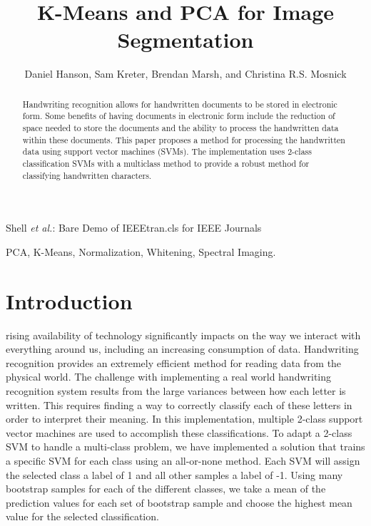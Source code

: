 \documentclass[journal]{IEEEtran}
\begin{document}
\title{K-Means and PCA for Image\\ Segmentation}


\author{Daniel Hanson, Sam Kreter, Brendan Marsh, and Christina R.S. Mosnick}

{Shell \MakeLowercase{\textit{et al.}}: Bare Demo of IEEEtran.cls for IEEE Journals}

\maketitle

\begin{abstract}
Handwriting recognition allows for handwritten documents to be stored in electronic form. Some benefits of having documents in electronic form include the reduction of space needed to store the documents and the ability to process the handwritten data within these documents. This paper proposes a method for processing the handwritten data using support vector machines (SVMs). The implementation uses 2-class classification SVMs with a multiclass method to provide a robust method for classifying handwritten characters.
\end{abstract}

\begin{IEEEkeywords}
    PCA, K-Means, Normalization, Whitening, Spectral Imaging.
\end{IEEEkeywords}

\IEEEpeerreviewmaketitle

\section{Introduction}

 rising availability of technology significantly impacts on the way we interact with everything around us, including an increasing consumption of data. Handwriting recognition provides an extremely efficient method for reading data from the physical world. The challenge with implementing a real world handwriting recognition system results from the large variances between how each letter is written. This requires finding a way to correctly classify each of these letters in order to interpret their meaning. In this implementation, multiple 2-class support vector machines are used to accomplish these classifications. To adapt a 2-class SVM to handle a multi-class problem, we have implemented a solution that trains a specific SVM for each class using an all-or-none method. Each SVM will assign the selected class a label of 1 and all other samples a label of -1. Using many bootstrap samples for each of the different classes, we take a mean of the prediction values for each set of bootstrap sample and choose the highest mean value for the selected classification.\\
\end{document}
